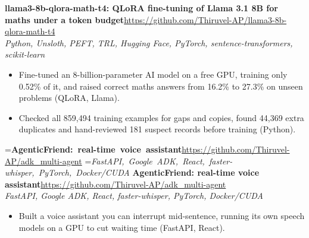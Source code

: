 \documentclass[a4paper,11pt]{article}
\newcommand{\project}[3]{%
  \textbf{#1}\hfill#3\\ {\color{muted}\small\textit{#2}}\par}
\newcommand{\gap}{\vspace{5pt}}
\begin{document}
\ifdim\wd0>\linewidth
\ifdim\wd2>\linewidth
\textbf{llama3-8b-qlora-math-t4: QLoRA fine-tuning of Llama 3.1 8B for maths under a token budget}\\ {\color{muted}\small\textit{Python, Unsloth, PEFT, TRL, Hugging Face, PyTorch, sentence-transformers, scikit-learn}}\\ \hspace*{\fill}{\small\url{https://github.com/Thiruvel-AP/llama3-8b-qlora-math-t4}}\par
\else
\textbf{llama3-8b-qlora-math-t4: QLoRA fine-tuning of Llama 3.1 8B for maths under a token budget}\\ {\color{muted}\small\textit{Python, Unsloth, PEFT, TRL, Hugging Face, PyTorch, sentence-transformers, scikit-learn}}\hfill{\small\url{https://github.com/Thiruvel-AP/llama3-8b-qlora-math-t4}}\par
\fi
\else
\project{llama3-8b-qlora-math-t4: QLoRA fine-tuning of Llama 3.1 8B for maths under a token budget}{Python, Unsloth, PEFT, TRL, Hugging Face, PyTorch, sentence-transformers, scikit-learn}{\url{https://github.com/Thiruvel-AP/llama3-8b-qlora-math-t4}}
\fi
\begin{itemize}
  \item Fine-tuned an 8-billion-parameter AI model on a free GPU, training only 0.52\% of it, and raised correct maths answers from 16.2\% to 27.3\% on unseen problems (QLoRA, Llama).
  \item Checked all 859,494 training examples for gaps and copies, found 44,369 extra duplicates and hand-reviewed 181 suspect records before training (Python).
\end{itemize}
\gap
{}
=\hbox{\textbf{AgenticFriend: real-time voice assistant}\hspace{1em}\url{https://github.com/Thiruvel-AP/adk_multi-agent}}%
=\hbox{{\small\textit{FastAPI, Google ADK, React, faster-whisper, PyTorch, Docker/CUDA}}}%
\ifdim\wd0>\linewidth
\ifdim\wd2>\linewidth
\textbf{AgenticFriend: real-time voice assistant}\\ {\color{muted}\small\textit{FastAPI, Google ADK, React, faster-whisper, PyTorch, Docker/CUDA}}\\ \hspace*{\fill}{\small\url{https://github.com/Thiruvel-AP/adk_multi-agent}}\par
\else
\textbf{AgenticFriend: real-time voice assistant}\\ {\color{muted}\small\textit{FastAPI, Google ADK, React, faster-whisper, PyTorch, Docker/CUDA}}\hfill{\small\url{https://github.com/Thiruvel-AP/adk_multi-agent}}\par
\fi
\else
\project{AgenticFriend: real-time voice assistant}{FastAPI, Google ADK, React, faster-whisper, PyTorch, Docker/CUDA}{\url{https://github.com/Thiruvel-AP/adk_multi-agent}}
\fi
\begin{itemize}
  \item Built a voice assistant you can interrupt mid-sentence, running its own speech models on a GPU to cut waiting time (FastAPI, React).
\end{itemize}
\end{document}
